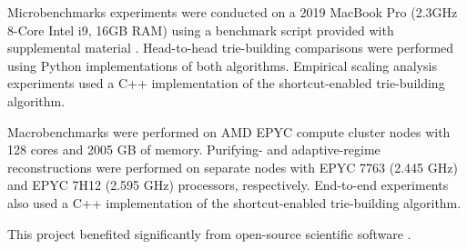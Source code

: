 Microbenchmarks experiments were conducted on a 2019 MacBook Pro (2.3GHz 8-Core Intel i9, 16GB RAM) using a benchmark script provided with supplemental material \citep{supplemental}.
Head-to-head trie-building comparisons were performed using Python implementations of both algorithms.
Empirical scaling analysis experiments used a C++ implementation of the shortcut-enabled trie-building algorithm.

Macrobenchmarks were performed on AMD EPYC compute cluster nodes with 128 cores and 2005 GB of memory.
Purifying- and adaptive-regime reconstructions were performed on separate nodes with EPYC 7763 (2.445 GHz) and EPYC 7H12 (2.595 GHz) processors, respectively.
End-to-end experiments also used a C++ implementation of the shortcut-enabled trie-building algorithm.

This project benefited significantly from open-source scientific software \citep{2020SciPy-NMeth,harris2020array,reback2020pandas,mckinney2010data,waskom2021seaborn,hunter2007matplotlib,moreno2023teeplot,moreno2024downstream}.
